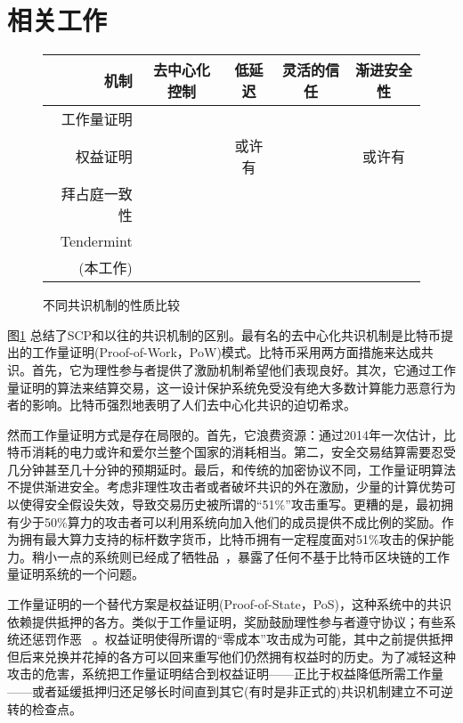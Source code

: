 \section{相关工作}

\begin{figure}
\begin{tabu}{r<{\quad}cccc}
  \toprule
  \rowfont\bfseries
	机制 &	去中心化控制 &	低延迟 &	灵活的信任 &	渐进安全性\\
	\midrule
	工作量证明 & \checkmark &&& \\
	权益证明 & \checkmark & 或许有 && 或许有	\\
	拜占庭一致性 && \checkmark & \checkmark & \checkmark \\
	Tendermint & \checkmark & \checkmark && \checkmark \\
	{\FBA}(本工作) & \checkmark & \checkmark & \checkmark & \checkmark \\ 
	\bottomrule
\end{tabu}
\caption{不同共识机制的性质比较}
\label{fig:relwk}
\end{figure}


图\ref{fig:relwk} 总结了SCP和以往的共识机制的区别。最有名的去中心化共识机制是比特币提出的工作量证明(Proof-of-Work，PoW)模式。比特币采用两方面措施来达成共识。首先，它为理性参与者提供了激励机制希望他们表现良好。其次，它通过工作量证明的算法来结算交易，这一设计保护系统免受没有绝大多数计算能力恶意行为者的影响。比特币强烈地表明了人们去中心化共识的迫切希求。

然而工作量证明方式是存在局限的。首先，它浪费资源：通过2014年一次估计，比特币消耗的电力或许和爱尔兰整个国家的消耗相当。第二，安全交易结算需要忍受几分钟甚至几十分钟的预期延时。最后，和传统的加密协议不同，工作量证明算法不提供渐进安全。考虑非理性攻击者或者破坏共识的外在激励，少量的计算优势可以使得安全假设失效，导致交易历史被所谓的``51\%''攻击重写。更糟的是，最初拥有少于50\%算力的攻击者可以利用系统向加入他们的成员提供不成比例的奖励。作为拥有最大算力支持的标杆数字货币，比特币拥有一定程度面对51\%攻击的保护能力。稍小一点的系统则已经成了牺牲品~\cite{attack_bbt2013,attack_cb2013}，暴露了任何不基于比特币区块链的工作量证明系统的一个问题。

工作量证明的一个替代方案是权益证明(Proof-of-State，PoS)，这种系统中的共识依赖提供抵押的各方。类似于工作量证明，奖励鼓励理性参与者遵守协议；有些系统还惩罚作恶~\cite{slasher2014, neucoin2015} 。权益证明使得所谓的``零成本''攻击成为可能，其中之前提供抵押但后来兑换并花掉的各方可以回来重写他们仍然拥有权益时的历史。为了减轻这种攻击的危害，系统把工作量证明结合到权益证明——正比于权益降低所需工作量——或者延缓抵押归还足够长时间直到其它(有时是非正式的)共识机制建立不可逆转的检查点。

